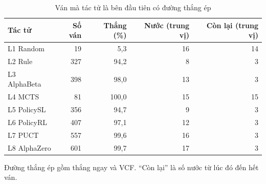\begin{table}[H]
  \centering
  \small
  \caption{Ván mà tác tử là bên đầu tiên có đường thắng ép}
  \label{tab:cs-nuoc-dautien}
  \begin{tabular}{lrrrr}
    \toprule
    Tác tử & Số ván & Thắng (\%) & Nước (trung vị) & Còn lại (trung vị) \\
    \midrule
    L1 Random & 19 & 5,3 & 16 & 14 \\
    L2 Rule & 327 & 94,2 & 8 & 3 \\
    L3 AlphaBeta & 398 & 98,0 & 13 & 3 \\
    L4 MCTS & 81 & 100,0 & 15 & 15 \\
    L5 PolicySL & 356 & 94,7 & 9 & 3 \\
    L6 PolicyRL & 407 & 97,1 & 12 & 3 \\
    L7 PUCT & 557 & 99,6 & 16 & 3 \\
    L8 AlphaZero & 601 & 99,7 & 17 & 3 \\
    \bottomrule
  \end{tabular}
  \par\smallskip\parbox{.95\linewidth}{\footnotesize Đường thắng ép gồm thắng ngay và VCF. ``Còn lại'' là số nước từ lúc đó đến hết ván.}
\end{table}

